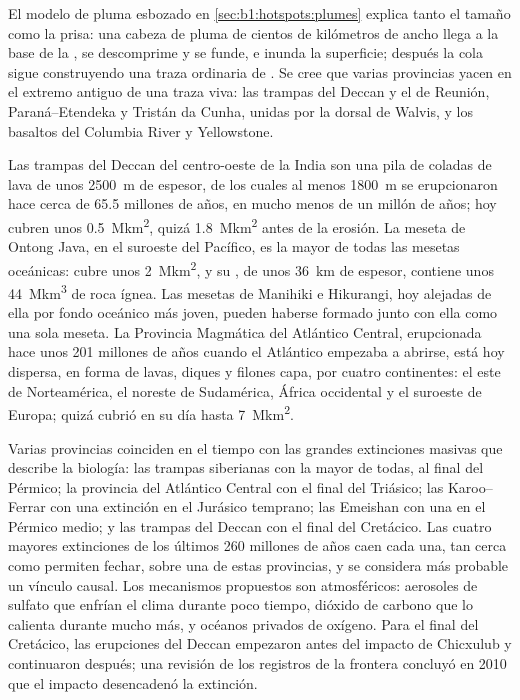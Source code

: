 \noindent El modelo de pluma esbozado en \cref{sec:b1:hotspots:plumes} explica tanto el tamaño como la prisa: una cabeza de pluma de cientos de
kilómetros de ancho llega a la base de la , se descomprime y se funde, e inunda la superficie; después la cola sigue construyendo una traza
ordinaria de . Se cree que varias provincias yacen en el extremo antiguo de una traza viva: las trampas del Deccan y el 
de Reunión, Paraná--Etendeka y Tristán da Cunha, unidas por la dorsal de Walvis, y los basaltos del Columbia River y Yellowstone.

Las trampas del Deccan del centro-oeste de la India son una pila de coladas de lava de unos \qty{2500}{m} de espesor, de los cuales al menos
\qty{1800}{m} se erupcionaron hace cerca de 65.5 millones de años, en mucho menos de un millón de años; hoy cubren unos \qty{0.5}{\mega km^2}, quizá
\qty{1.8}{\mega km^2} antes de la erosión. La meseta de Ontong Java, en el suroeste del Pacífico, es la mayor de todas las mesetas oceánicas: cubre
unos \qty{2}{\mega km^2}, y su , de unos \qty{36}{km} de espesor, contiene unos \qty{44}{\mega km^3} de roca ígnea. Las mesetas de Manihiki e
Hikurangi, hoy alejadas de ella por fondo oceánico más joven, pueden haberse formado junto con ella como una sola meseta. La Provincia Magmática del
Atlántico Central, erupcionada hace unos 201 millones de años cuando el Atlántico empezaba a abrirse, está hoy dispersa, en forma de lavas, diques y
filones capa, por cuatro continentes: el este de Norteamérica, el noreste de Sudamérica, África occidental y el suroeste de Europa; quizá cubrió en su
día hasta \qty{7}{\mega km^2}.


Varias provincias coinciden en el tiempo con las grandes extinciones masivas que describe la biología: las trampas siberianas con la mayor de todas,
al final del Pérmico; la provincia del Atlántico Central con el final del Triásico; las Karoo--Ferrar con una extinción en el Jurásico temprano; las
Emeishan con una en el Pérmico medio; y las trampas del Deccan con el final del Cretácico. Las cuatro mayores extinciones de los últimos 260 millones
de años caen cada una, tan cerca como permiten fechar, sobre una de estas provincias, y se considera más probable un vínculo causal. Los mecanismos
propuestos son atmosféricos: aerosoles de sulfato que enfrían el clima durante poco tiempo, dióxido de carbono que lo calienta durante mucho más, y
océanos privados de oxígeno. Para el final del Cretácico, las erupciones del Deccan empezaron antes del impacto de Chicxulub y continuaron después;
una revisión de los registros de la frontera concluyó en 2010 que el impacto desencadenó la extinción.

